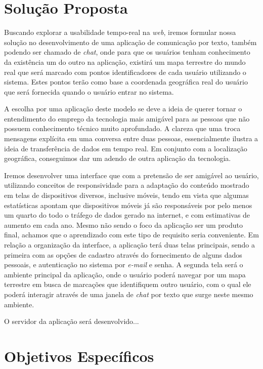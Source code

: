 \section{Solução Proposta}
Buscando explorar a usabilidade tempo-real na \textit{web}, iremos formular nossa solução no desenvolvimento de uma aplicação de comunicação por texto, também podendo ser chamado de \textit{chat}, onde para que os usuários tenham conhecimento da existência um do outro na aplicação, existirá um mapa terrestre do mundo real que será marcado com pontos identificadores de cada usuário utilizando o sistema. Estes pontos terão como base a coordenada geográfica real do usuário que será fornecida quando o usuário entrar no sistema.

A escolha por uma aplicação deste modelo se deve a ideia de querer tornar o entendimento do emprego da tecnologia mais amigável para as pessoas que não possuem conhecimento técnico muito aprofundado. A clareza que uma troca mensagens explícita em uma conversa entre duas pessoas, essencialmente ilustra a ideia de transferência de dados em tempo real. Em conjunto com a localização geográfica, conseguimos dar um adendo de outra aplicação da tecnologia.

Iremos desenvolver uma interface que com a pretensão de ser amigável ao usuário, utilizando conceitos de responsividade para a adaptação do conteúdo mostrado em telas de dispositivos diversos, inclusive móveis, tendo em vista que algumas estatísticas \cite{internet-traffic-stats1} apontam que dispositivos móveis já são responsáveis por pelo menos um quarto do todo o tráfego de dados gerado na internet, e com estimativas \cite{internet-traffic-stats2} \cite{internet-traffic-stats3} de aumento em cada ano. Mesmo não sendo o foco da aplicação ser um produto final, achamos que o aprendizado com este tipo de requisito seria conveniente. Em relação a organização da interface, a aplicação terá duas telas principais, sendo a primeira com as opções de cadastro através do fornecimento de alguns dados pessoais, e autenticação no sistema por \textit{e-mail} e senha. A segunda tela será o ambiente principal da aplicação, onde o usuário poderá navegar por um mapa terrestre em busca de marcações que identifiquem outro usuário, com o qual ele poderá interagir através de uma janela de \textit{chat} por texto que surge neste mesmo ambiente.

O servidor da aplicação será desenvolvido...

\section{Objetivos Específicos}